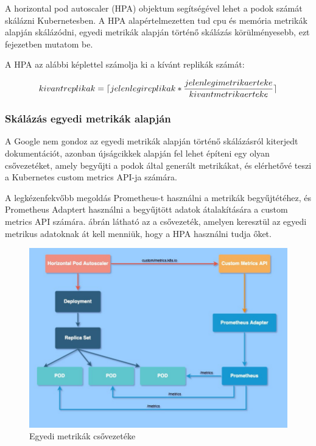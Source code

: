 \documentclass[a4paper,oneside]{article}
\DeclarePairedDelimiter\ceil{\lceil}{\rceil}
\begin{document}
A horizontal pod autoscaler \cite{kubernetes-hpa} (HPA) objektum segítségével
lehet a podok számát skálázni Kubernetesben. A HPA alapértelmezetten tud cpu és
memória metrikák alapján skálázódni, egyedi metrikák alapján történő skálázás
körülményesebb, ezt  fejezetben mutatom be.

A HPA az alábbi képlettel számolja ki a kívánt replikák számát:
 
\begin{equation}
  kivantreplikak = \ceil{jelenlegireplikak * \frac{jelenlegimetrikaerteke }{kivantmetrikaerteke}}
\end{equation}


\subsubsection{Skálázás egyedi metrikák alapján}
\label{secsec:custom_metrics}

A Google nem gondoz az egyedi metrikák alapján történő skálázásról kiterjedt
dokumentációt, azonban újságcikkek alapján \cite{custom-metrics-1}
\cite{custom-metrics-2} fel lehet építeni egy olyan csővezetéket, amely begyűjti
a podok által generált metrikákat, és elérhetővé teszi a Kubernetes custom
metrics API-ja számára.

A legkézenfekvőbb megoldás Prometheus-t \cite{prometheus} használni a metrikák
begyűjtétéhez, és Prometheus Adaptert \cite{promehteus-adapter} használni a
begyűjtött adatok átalakítására a custom metrics API számára.
 ábrán látható az a csővezeték, amelyen keresztül az
egyedi metrikus adatoknak át kell menniük, hogy a HPA használni tudja őket.

\begin{figure}[H]
  \centering
  \includegraphics[width=\textwidth]{custom-metrics-pipeline.jpeg}
  \caption{Egyedi metrikák csővezetéke}
  \label{fig:custom-metrics}  
\end{figure}
\end{document}
